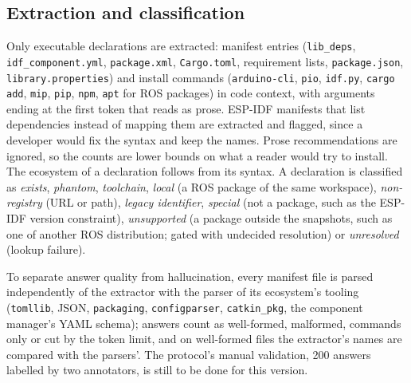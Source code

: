\documentclass[conference]{IEEEtran}
\begin{document}
\subsection{Extraction and classification}
\label{sec:extraction}
Only executable declarations are extracted: manifest entries (\texttt{lib\_deps}, \texttt{idf\_component.yml},
\texttt{package.xml}, \texttt{Cargo.toml}, requirement lists, \texttt{package.json}, \texttt{library.properties})
and install commands (\texttt{arduino-cli}, \texttt{pio}, \texttt{idf.py}, \texttt{cargo add}, \texttt{mip},
\texttt{pip}, \texttt{npm}, \texttt{apt} for ROS packages) in code context, with arguments ending at the first token
that reads as prose. ESP-IDF manifests that list dependencies instead of mapping them are extracted and flagged, since
a developer would fix the syntax and keep the names. Prose recommendations are ignored, so the counts are lower bounds
on what a reader would try to install. The ecosystem of a declaration follows from its syntax. A declaration is classified as \emph{exists}, \emph{phantom}, \emph{toolchain}, \emph{local} (a ROS
package of the same workspace), \emph{non-registry} (URL or path), \emph{legacy identifier}, \emph{special} (not a
package, such as the ESP-IDF version constraint), \emph{unsupported} (a package outside the snapshots, such as one of
another ROS distribution; gated with undecided resolution) or \emph{unresolved} (lookup failure).

To separate answer quality from hallucination, every manifest file is parsed independently of the extractor with the
parser of its ecosystem's tooling (\texttt{tomllib}, JSON, \texttt{packaging}, \texttt{configparser},
\texttt{catkin\_pkg}, the component manager's YAML schema); answers count as well-formed, malformed, commands only or
cut by the token limit, and on well-formed files the extractor's names are compared with the parsers'.
\ifnum{} The protocol's manual validation, 200 answers labelled by two annotators, is still to be
done for this version.\fi
\end{document}
